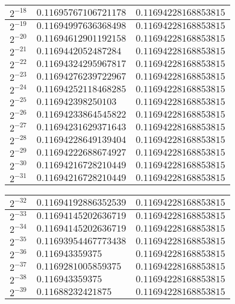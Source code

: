 \documentclass{article}
\begin{document}
\begin{center}
\begin{tabular}{|l|l|l|}
		\hline
		$2^{-18}$ & $0.11695767106721178$ & $0.11694228168853815$ \\
		\hline
		$2^{-19}$ & $0.11694997636368498$ & $0.11694228168853815$ \\
		\hline
		$2^{-20}$ & $0.11694612901192158$ & $0.11694228168853815$ \\
		\hline
		$2^{-21}$ & $0.1169442052487284$  & $0.11694228168853815$ \\
		\hline
		$2^{-22}$ & $0.11694324295967817$ & $0.11694228168853815$ \\
		\hline
		$2^{-23}$ & $0.11694276239722967$ & $0.11694228168853815$ \\
		\hline
		$2^{-24}$ & $0.11694252118468285$ & $0.11694228168853815$ \\
		\hline
		$2^{-25}$ & $0.116942398250103$   & $0.11694228168853815$ \\
		\hline
		$2^{-26}$ & $0.11694233864545822$ & $0.11694228168853815$ \\
		\hline
		$2^{-27}$ & $0.11694231629371643$ & $0.11694228168853815$ \\
		\hline
		$2^{-28}$ & $0.11694228649139404$ & $0.11694228168853815$ \\
		\hline
		$2^{-29}$ & $0.11694222688674927$ & $0.11694228168853815$ \\
		\hline
		$2^{-30}$ & $0.11694216728210449$ & $0.11694228168853815$ \\
		\hline
		$2^{-31}$ & $0.11694216728210449$ & $0.11694228168853815$ \\
		\hline
	\end{tabular}
	\begin{tabular}{|l|l|l|}
		\hline
		$2^{-32}$ & $0.11694192886352539$ & $0.11694228168853815$ \\
		\hline
		$2^{-33}$ & $0.11694145202636719$ & $0.11694228168853815$ \\
		\hline
		$2^{-34}$ & $0.11694145202636719$ & $0.11694228168853815$ \\
		\hline
		$2^{-35}$ & $0.11693954467773438$ & $0.11694228168853815$ \\
		\hline
		$2^{-36}$ & $0.116943359375$      & $0.11694228168853815$ \\
		\hline
		$2^{-37}$ & $0.1169281005859375$  & $0.11694228168853815$ \\
		\hline
		$2^{-38}$ & $0.116943359375$      & $0.11694228168853815$ \\
		\hline
		$2^{-39}$ & $0.11688232421875$    & $0.11694228168853815$ \\
		\hline

\end{tabular}
\end{center}
\end{document}
